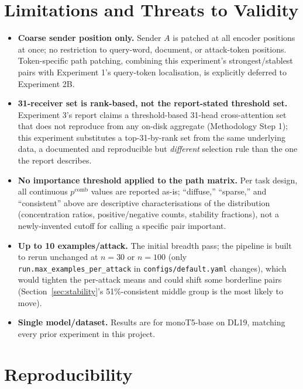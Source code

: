 \documentclass[11pt]{article}
\newcommand{\pcomb}{\ensuremath{p^{\mathrm{comb}}}}
\begin{document}
\section{Limitations and Threats to Validity}

\begin{itemize}
  \item \textbf{Coarse sender position only.} Sender $A$ is patched at all
  encoder positions at once; no restriction to query-word, document, or
  attack-token positions. Token-specific path patching, combining this
  experiment's strongest/stablest pairs with Experiment 1's query-token
  localisation, is explicitly deferred to Experiment 2B.
  \item \textbf{31-receiver set is rank-based, not the report-stated
  threshold set.} Experiment 3's report claims a threshold-based 31-head
  cross-attention set that does not reproduce from any on-disk aggregate
  (Methodology Step 1); this experiment substitutes a top-31-by-rank set
  from the same underlying data, a documented and reproducible but
  \emph{different} selection rule than the one the report describes.
  \item \textbf{No importance threshold applied to the path matrix.} Per
  task design, all continuous $\pcomb$ values are reported as-is; ``diffuse,''
  ``sparse,'' and ``consistent'' above are descriptive characterisations of
  the distribution (concentration ratios, positive/negative counts,
  stability fractions), not a newly-invented cutoff for calling a specific
  pair important.
  \item \textbf{Up to 10 examples/attack.} The initial breadth pass; the
  pipeline is built to rerun unchanged at $n{=}30$ or $n{=}100$ (only
  \texttt{run.max\_examples\_per\_attack} in \texttt{configs/default.yaml}
  changes), which would tighten the per-attack means and could shift some
  borderline pairs (Section~\ref{sec:stability}'s 51\%-consistent middle
  group is the most likely to move).
  \item \textbf{Single model/dataset.} Results are for monoT5-base on DL19,
  matching every prior experiment in this project.
\end{itemize}

\section{Reproducibility}
\end{document}
